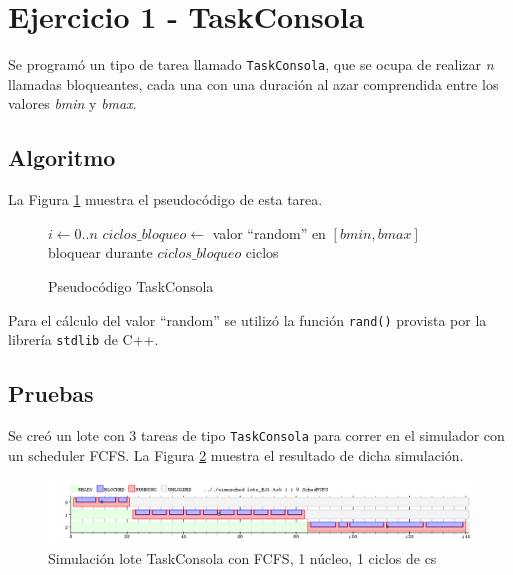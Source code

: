 \section{Ejercicio 1 - TaskConsola}

Se programó un tipo de tarea llamado {\tt TaskConsola}, que se ocupa de realizar {\it n} llamadas bloqueantes, cada una con una duración al azar comprendida entre los valores {\it bmin} y {\it bmax}.

\subsection{Algoritmo}

La Figura \ref{cod-tconsola} muestra el pseudocódigo de esta tarea.

\begin{figure}[!htb]
\begin{codebox}
\li \For $i \leftarrow 0 .. n$
\li \Do 	$ciclos\_bloqueo \leftarrow$ valor ``random'' en $[bmin,bmax]$
\li 		bloquear durante $ciclos\_bloqueo$ ciclos
\End
\end{codebox}
\caption{Pseudocódigo TaskConsola}\label{cod-tconsola}
\end{figure}

Para el cálculo del valor ``random'' se utilizó la función {\tt rand()} provista por la librería {\tt stdlib} de C++.

\subsection{Pruebas}

Se creó un lote con 3 tareas de tipo {\tt TaskConsola} para correr en el simulador con un scheduler FCFS.  La Figura \ref{fig-1} muestra el resultado de dicha simulación.

\begin{figure}[!htb]
\begin{center}
  \includegraphics[scale=0.45]{imagenes/ej1.png}
\end{center}
\caption{Simulación lote TaskConsola con FCFS, 1 núcleo, 1 ciclos de cs}\label{fig-1}
\end{figure}